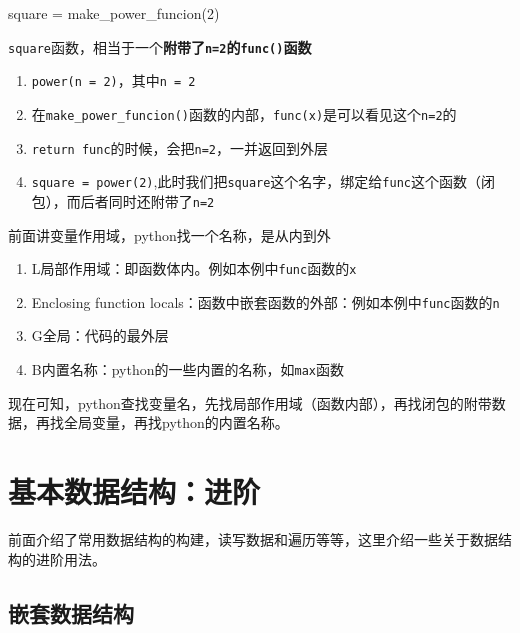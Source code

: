 \documentclass[
  letterpaper,
  DIV=11,
  numbers=noendperiod]{scrreprt}
\newenvironment{Shaded}{\begin{snugshade}}{\end{snugshade}}
\newcommand{\DecValTok}[1]{\textcolor[rgb]{0.68,0.00,0.00}{#1}}
\newcommand{\NormalTok}[1]{\textcolor[rgb]{0.00,0.23,0.31}{#1}}
\newcommand{\OperatorTok}[1]{\textcolor[rgb]{0.37,0.37,0.37}{#1}}
\providecommand{\tightlist}{%
  \setlength{\itemsep}{0pt}\setlength{\parskip}{0pt}}\usepackage{longtable,booktabs,array}
\begin{document}
\begin{Shaded}
\begin{Highlighting}[]
\NormalTok{square }\OperatorTok{=}\NormalTok{ make\_power\_funcion(}\DecValTok{2}\NormalTok{) }
\end{Highlighting}
\end{Shaded}

\texttt{square}函数，相当于一个\textbf{附带了\texttt{n=2}的\texttt{func()}函数}

\begin{enumerate}
\def\labelenumi{\arabic{enumi}.}
\tightlist
\item
  \texttt{power(n\ =\ 2)}，其中\texttt{n\ =\ 2}
\item
  在\texttt{make\_power\_funcion()}函数的内部，\texttt{func(x)}是可以看见这个\texttt{n=2}的
\item
  \texttt{return\ func}的时候，会把\texttt{n=2}，一并返回到外层
\item
  \texttt{square\ =\ power(2)},此时我们把\texttt{square}这个名字，绑定给\texttt{func}这个函数（闭包），而后者同时还附带了\texttt{n=2}
\end{enumerate}

前面讲变量作用域，python找一个名称，是从内到外

\begin{enumerate}
\def\labelenumi{\arabic{enumi}.}
\tightlist
\item
  L局部作用域：即函数体内。例如本例中\texttt{func}函数的\texttt{x}
\item
  Enclosing function
  locals：函数中嵌套函数的外部：例如本例中\texttt{func}函数的\texttt{n}
\item
  G全局：代码的最外层
\item
  B内置名称：python的一些内置的名称，如\texttt{max}函数
\end{enumerate}

现在可知，python查找变量名，先找局部作用域（函数内部），再找闭包的附带数据，再找全局变量，再找python的内置名称。

\hypertarget{ux57faux672cux6570ux636eux7ed3ux6784ux8fdbux9636}{%
\chapter{基本数据结构：进阶}\label{ux57faux672cux6570ux636eux7ed3ux6784ux8fdbux9636}}

前面介绍了常用数据结构的构建，读写数据和遍历等等，这里介绍一些关于数据结构的进阶用法。

\hypertarget{ux5d4cux5957ux6570ux636eux7ed3ux6784}{%
\section{嵌套数据结构}\label{ux5d4cux5957ux6570ux636eux7ed3ux6784}}
\end{document}

